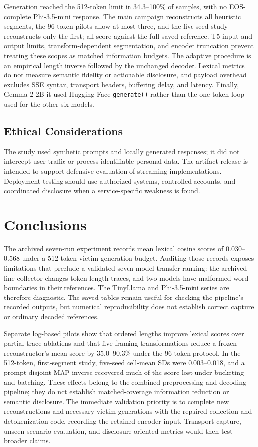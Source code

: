 \documentclass[electronics,article,submit,pdftex,moreauthors]{Definitions/mdpi}
\begin{document}
Generation reached the 512-token limit in 34.3--100\% of samples, with no EOS-complete Phi-3.5-mini response. The main campaign reconstructs all heuristic segments, the 96-token pilots allow at most three, and the five-seed study reconstructs only the first; all score against the full saved reference. T5 input and output limits, transform-dependent segmentation, and encoder truncation prevent treating these scopes as matched information budgets. The adaptive procedure is an empirical length inverse followed by the unchanged decoder. Lexical metrics do not measure semantic fidelity or actionable disclosure, and payload overhead excludes SSE syntax, transport headers, buffering delay, and latency. Finally, Gemma-2-2B-it used Hugging Face \texttt{generate()} rather than the one-token loop used for the other six models.

\subsection{Ethical Considerations}
The study used synthetic prompts and locally generated responses; it did not intercept user traffic or process identifiable personal data. The artifact release is intended to support defensive evaluation of streaming implementations. Deployment testing should use authorized systems, controlled accounts, and coordinated disclosure when a service-specific weakness is found.

\section{Conclusions}
The archived seven-run experiment records mean lexical cosine scores of 0.030--0.568 under a 512-token victim-generation budget. Auditing those records exposes limitations that preclude a validated seven-model transfer ranking: the archived line collector changes token-length traces, and two models have malformed word boundaries in their references. The TinyLlama and Phi-3.5-mini series are therefore diagnostic. The saved tables remain useful for checking the pipeline's recorded outputs, but numerical reproducibility does not establish correct capture or ordinary decoded references.

Separate log-based pilots show that ordered lengths improve lexical scores over partial trace ablations and that five framing transformations reduce a frozen reconstructor's mean score by 35.0--90.3\% under the 96-token protocol. In the 512-token, first-segment study, five-seed cell-mean SDs were 0.003--0.018, and a prompt-disjoint MAP inverse recovered much of the score lost under bucketing and batching. These effects belong to the combined preprocessing and decoding pipeline; they do not establish matched-coverage information reduction or semantic disclosure. The immediate validation priority is to complete new reconstructions and necessary victim generations with the repaired collection and detokenization code, recording the retained encoder input. Transport capture, unseen-scenario evaluation, and disclosure-oriented metrics would then test broader claims.
\end{document}
